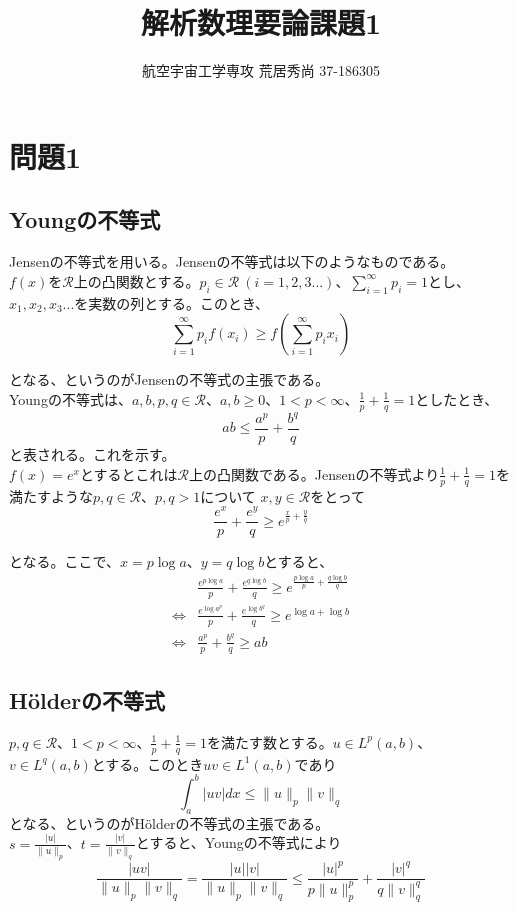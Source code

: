 \documentclass[a4paper,10pt]{jsarticle}
\title{解析数理要論課題1}
\author{航空宇宙工学専攻 荒居秀尚 37-186305}
\begin{document}
\maketitle

\section{問題1}
\subsection{Youngの不等式}
Jensenの不等式を用いる。Jensenの不等式は以下のようなものである。\\

$f(x)$を$\mathcal{R}$上の凸関数とする。$p_i\in \mathcal{R}~(i=1,2,3...)$、$\sum_{i=1}^\infty p_i=1$とし、
$x_1,x_2,x_3...$を実数の列とする。このとき、
\begin{equation}
 \sum_{i=1}^\infty p_if(x_i) \ge f\left(\sum_{i=1}^\infty p_ix_i\right)
\end{equation}

となる、というのがJensenの不等式の主張である。\\
Youngの不等式は、$a,b,p,q \in \mathcal{R}$、$a,b \ge 0$、$1 < p < \infty$、$\frac{1}{p}+\frac{1}{q}=1$としたとき、
\begin{equation}
 ab \le \frac{a^p}{p} + \frac{b^q}{q}
\end{equation}
と表される。これを示す。\\

$f(x)=e^x$とするとこれは$\mathcal{R}$上の凸関数である。Jensenの不等式より$\frac{1}{p}+\frac{1}{q}=1$を満たすような$p,q \in \mathcal{R}$、$p,q > 1$について
$x, y \in \mathcal{R}$をとって
\begin{equation}
 \frac{e^x}{p}+\frac{e^y}{q}\ge e^{\frac{x}{p}+\frac{y}{q}}
\end{equation}

となる。ここで、$x=p\log a$、$y=q\log b$とすると、
\begin{align}
 &\frac{e^{p\log a}}{p}+\frac{e^{q\log b}}{q} \ge e^{\frac{p\log a}{p}+\frac{q\log b}{q}} \\
 \iff&\frac{e^{\log a^p}}{p}+\frac{e^{\log b^q}}{q} \ge e^{\log a + \log b} \\
 \iff&\frac{a^p}{p}+\frac{b^q}{q}\ge ab
\end{align}

\subsection{H\"{o}lderの不等式}
$p, q\in\mathcal{R}$、$1 < p < \infty$、$\frac{1}{p} + \frac{1}{q}=1$を満たす数とする。$u \in L^p(a, b)$、$v \in L^q(a, b)$とする。このとき$uv\in L^1(a,b)$であり
\begin{equation}
 \int_a^b |uv|dx \le \|u\|_p \|v\|_q
\end{equation}
となる、というのがH\"{o}lderの不等式の主張である。\\
$s = \frac{|u|}{\|u\|_p}$、$t = \frac{|v|}{\|v\|_q}$とすると、Youngの不等式により
\begin{equation}
 \frac{|uv|}{\|u\|_p \|v\|_q} = \frac{|u||v|}{\|u\|_p \|v\|_q} \le \frac{|u|^p}{p\|u\|_p^p} + \frac{|v|^q}{q\|v\|_q^q}
\end{equation}
\end{document}
